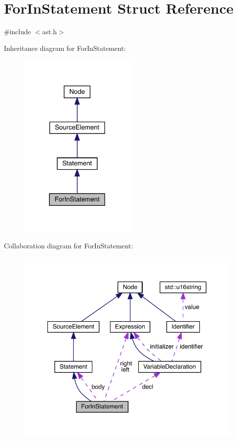\hypertarget{struct_for_in_statement}{}\section{For\+In\+Statement Struct Reference}
\label{struct_for_in_statement}


{\ttfamily \#include $<$ast.\+h$>$}



Inheritance diagram for For\+In\+Statement\+:\nopagebreak
\begin{figure}[H]
\begin{center}
\leavevmode
\includegraphics[width=165pt]{struct_for_in_statement__inherit__graph}
\end{center}
\end{figure}


Collaboration diagram for For\+In\+Statement\+:
\nopagebreak
\begin{figure}[H]
\begin{center}
\leavevmode
\includegraphics[width=340pt]{struct_for_in_statement__coll__graph}
\end{center}
\end{figure}
